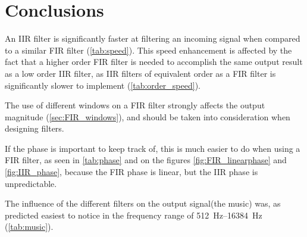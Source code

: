 
\section{Conclusions}
An IIR filter is significantly faster at filtering an incoming signal when compared to a similar FIR filter (\cref{tab:speed}). This speed enhancement is affected by the fact that a higher order FIR filter is needed to accomplish the same output result as a low order IIR filter, as IIR filters of equivalent order as a FIR filter is significantly slower to implement (\cref{tab:order_speed}).

The use of different windows on a FIR filter strongly affects the output magnitude (\cref{sec:FIR_windows}), and should be taken into consideration when designing filters.

If the phase is important to keep track of, this is much easier to do when using a FIR filter, as seen in \cref{tab:phase} and on the figures \ref{fig:FIR_linearphase} and \ref{fig:IIR_phase}, because the FIR phase is linear, but the IIR phase is unpredictable.

The influence of the different filters on the output signal(the music) was, as predicted easiest to notice in the frequency range of \SIrange{512}{16384}{\hertz} (\cref{tab:music}).